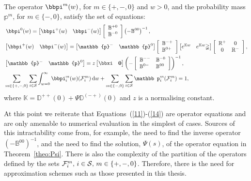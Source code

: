\begin{theo} 
	\label{theo:density} 
The operator ${\bbpi}^{m}(w)$, for $m \in \{+,-,0\}$ and $w > 0$, and the probability mass $\mathbb{p}^{m}$, for $m \in \{-,0\}$, satisfy the set of equations:
% 	 
	\begin{align} 
	&\label{11} \; \bbpi^{0}(w) = \vligne{\bbpi^{+}(w) & \bbpi^{-}(w)}\left[\begin{array}{l} \mathbb{B}^{+0} \\ \mathbb{B}^{-0} \end{array} \right]\left(-\mathbb{B}^{00}\right)^{-1}, \\
	&  \vligne{\bbpi^{+}(w) & \bbpi^{-}(w)} = \vligne{\mathbb{p}^{-} & \mathbb{p}^{0}}\left[\begin{array}{l} \mathbb{B}^{-+} \\ \mathbb{B}^{0+} \end{array} \right]\vligne{e^{\mathbb{K}w} & e^{\mathbb{K}w}\mathbb\Psi}\left[\begin{array}{cc} \mathbb{R}^{+} & 0 \\ 0 & \mathbb{R}^{-}\end{array}\right], \\
	&  \vligne{\mathbb{p}^{-}  & \mathbb{p}^{0}} = z \vligne{{\bbxi} & \bs{0}} 
	\left(-\left[\begin{array}{ll} 
		\mathbb{B}^{--} & \mathbb{B}^{-0} \\
		\mathbb{B}^{0-} & \mathbb{B}^{00} 
		\end{array} \right] \right)^{-1},  \label{eqn:mass}\\
	& \sum_{m \in \{+,-,0\}}\sum_{i \in \mathcal{S}} \int_{w = 0}^{\infty} \bbpi_i^{m}(w)(\mathcal{F}^{m}_i)\wrt w + \sum_{m \in \{-,0\}} \sum_{i \in \mathcal{S}}\mathbb p^{m}_i(\mathcal{F}^{m}_i) = 1, \label{14}
	\end{align}
	where $\mathbb{K} = \mathbb{D}^{++}(0) + \mathbb\Psi\mathbb{D}^{(-+)}(0)$ and $z$ is a normalising constant. 
\end{theo} 

At this point we reiterate that Equations~(\ref{11})-(\ref{14}) are operator equations and are only amenable to numerical evaluation in the simplest of cases. Sources of this intractability come from, for example, the need to find the inverse operator \(( - \mathbb B^{00})^{-1}\), and the need to find the solution, \(\mathbb \Psi(s)\), of the operator equation in Theorem~\ref{theo:Psi}. There is also the complexity of the partition of the operators defined by the sets \(\mathcal F_{i}^m,\, i\in\mathcal{S},\,m\in\{+,-,0\}\). Therefore, there is the need for approximation schemes such as those presented in this thesis. 


